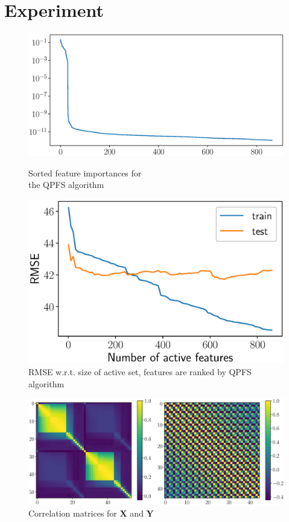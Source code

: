 \documentclass[12pt,twoside]{article}
\newcommand{\bY}{\mathbf{Y}}
\newcommand{\bX}{\mathbf{X}}
\begin{document}
\section{Experiment}

\begin{figure}
	\begin{minipage}{.5\linewidth}
		\centering
		\includegraphics[width=\linewidth]{figs/feature_scores_ex.eps}
		\caption{Sorted feature importances for \\ the QPFS algorithm}
		\label{fig:feature_scores_ex}
	\end{minipage}%
	\begin{minipage}{.5\linewidth}
	\centering
	\includegraphics[width=\linewidth]{figs/train_test_qpfs.eps}
	\caption{RMSE w.r.t. size of active set, features are ranked by QPFS algorithm}
	\label{fig:train_test_qpfs}
	\end{minipage}
\end{figure}

\begin{figure}
	\includegraphics[width=\linewidth]{figs/corr_matrix.eps}
	\caption{Correlation matrices for $\bX$ and $\bY$}
	\label{fig:corr_matrix}
\end{figure}
\end{document}
